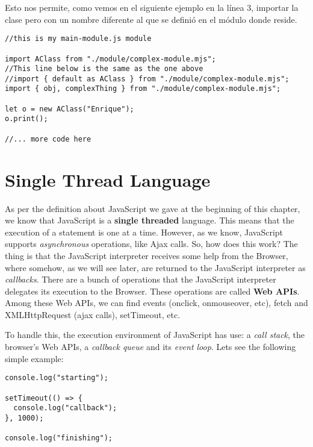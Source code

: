 \documentclass[a4paper, oneside, titlepage, 12pt]{book}
\begin{document}
Esto nos permite, como vemos en el siguiente ejemplo en la línea 3, importar la clase pero con un nombre diferente al que se definió en el módulo donde reside.

\begin{verbatim}
//this is my main-module.js module

import AClass from "./module/complex-module.mjs";
//This line below is the same as the one above
//import { default as AClass } from "./module/complex-module.mjs";
import { obj, complexThing } from "./module/complex-module.mjs";

let o = new AClass("Enrique");
o.print();

//... more code here
\end{verbatim}


\section{Single Thread Language} \label{single_thread}

As per the definition about JavaScript we gave at the beginning of this chapter, we know that JavaScript is a \textbf{single threaded} language. This means that the execution of a statement is one at a time. However, as we know, JavaScript supports \textit{asynchronous} operations, like Ajax calls. So, how does this work? The thing is that the JavaScript interpreter receives some help from the Browser, where somehow, as we will see later, are returned to the JavaScript interpreter as \textit{callbacks}. There are a bunch of operations that the JavaScript interpreter delegates its execution to the Browser. These operations are called \textbf{Web APIs}. Among these Web APIs, we can find events (onclick, onmouseover, etc), fetch and XMLHttpRequest (ajax calls), setTimeout, etc.

To handle this, the execution environment of JavaScript has use: a \textit{call stack}, the browser's Web APIs, a \textit{callback queue} and its \textit{event loop}. Lets see the following simple example:

\begin{verbatim}
console.log("starting");

setTimeout(() => {
  console.log("callback");
}, 1000);

console.log("finishing");
\end{verbatim}
\end{document}
